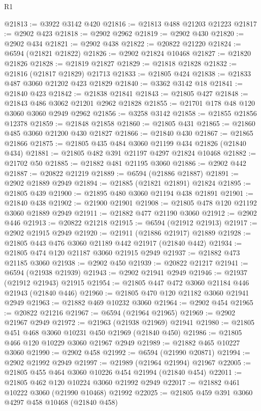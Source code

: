 \begin{lexlean}{R1}
\begin{coremodule}
@21813 := @3922 @3142 @420
@21816 := @21813 @488 @21203 @21223
@21817 := @2902 @423
@21818 := @2902 @2962
@21819 := @2902 @430
@21820 := @2902 @434
@21821 := @2902 @438
@21822 := @20822 @21220
@21824 := @6594 (@21821 @21822)
@21826 := @2902 @21824 @10468
@21827 := @21820 @21826
@21828 := @21819 @21827
@21829 := @21818 @21828
@21832 := @21816 (@21817 @21829) @21713
@21833 := @21805 @424
@21838 := @21833 @487 @3060 @21202 @423 @21829
@21840 := @3362 @3142 @18
@21841 := @21840 @423
@21842 := @21838 @21841
@21843 := @21805 @427
@21848 := @21843 @486 @3062 @21201 @2962 @21828
@21855 := @21701 @178 @48 @120 @3060 @3060 @2949 @2962
@21856 := @3258 @3142
@21858 := @21855 @21856 @12378
@21859 := @21848 @21858
@21860 := @21805 @431
@21865 := @21860 @485 @3060 @21200 @430 @21827
@21866 := @21840 @430
@21867 := @21865 @21866
@21875 := @21805 @435 @484 @3060 @21199 @434 @21826 (@21840 @434)
@21881 := @21805 @482 @391 @21197 @4297 @21824 @10468
@21882 := @21702 @50
@21885 := @21882 @481 @21195 @3060
@21886 := @2902 @442
@21887 := @20822 @21219
@21889 := @6594 (@21886 @21887)
@21891 := @2902 @21889 @2949
@21894 := @21885 (@21821 @21891) @21824
@21895 := @21805 @439
@21900 := @21895 @480 @3060 @21194 @438 @21891
@21901 := @21840 @438
@21902 := @21900 @21901
@21908 := @21805 @478 @120 @21192 @3060 @21889 @2949
@21911 := @21882 @477 @21190 @3060
@21912 := @2902 @446
@21913 := @20822 @21218
@21915 := @6594 (@21912 @21913)
@21917 := @2902 @21915 @2949
@21920 := @21911 (@21886 @21917) @21889
@21928 := @21805 @443 @476 @3060 @21189 @442 @21917 (@21840 @442)
@21934 := @21805 @474 @120 @21187 @3060 @21915 @2949
@21937 := @21882 @473 @21185 @3060
@21938 := @2902 @450
@21939 := @20822 @21217
@21941 := @6594 (@21938 @21939)
@21943 := @2902 @21941 @2949
@21946 := @21937 (@21912 @21943) @21915
@21954 := @21805 @447 @472 @3060 @21184 @446 @21943 (@21840 @446)
@21960 := @21805 @470 @120 @21182 @3060 @21941 @2949
@21963 := @21882 @469 @10232 @3060
@21964 := @2902 @454
@21965 := @20822 @21216
@21967 := @6594 (@21964 @21965)
@21969 := @2902 @21967 @2949
@21972 := @21963 (@21938 @21969) @21941
@21980 := @21805 @451 @468 @3060 @10231 @450 @21969 (@21840 @450)
@21986 := @21805 @466 @120 @10229 @3060 @21967 @2949
@21989 := @21882 @465 @10227 @3060
@21990 := @2902 @458
@21992 := @6594 (@21990 @20871)
@21994 := @2902 @21992 @2949
@21997 := @21989 (@21964 @21994) @21967
@22005 := @21805 @455 @464 @3060 @10226 @454 @21994 (@21840 @454)
@22011 := @21805 @462 @120 @10224 @3060 @21992 @2949
@22017 := @21882 @461 @10222 @3060 (@21990 @10468) @21992
@22025 := @21805 @459 @391 @3060 @4297 @458 @10468 (@21840 @458)

\end{coremodule}
\end{lexlean}
